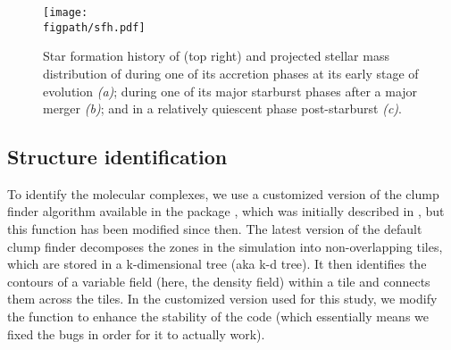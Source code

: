 \documentclass[iop]{emulateapj} %
\begin{document}
\begin{figure*}[htbp]
\centering
\texttt{[image: \\figpath/sfh.pdf]}
\caption{
	Star formation history of \flower (top right) and
	projected stellar mass distribution of \flower during one of its accretion phases
	at its early stage of evolution {\it (a)}; during one of its major starburst phases
	after a major merger {\it (b)}; and in a relatively quiescent phase post-starburst {\it (c)}.
\label{fig:SFH}}
\end{figure*}


\subsection{Structure identification} \label{sec:method}
To identify the molecular complexes, we use a customized version of the clump finder algorithm available in the  package  \citep{Turk2011a}, which was initially described in \citet{Smith09a}, but this function has been modified since then.
%
The latest version of the default  clump finder decomposes the zones in the simulation into non-overlapping tiles, which are stored in a k-dimensional tree (aka k-d tree). It then identifies the contours of a variable field (here, the density field) within a tile and connects them across the tiles. 
In the customized version used for this study, we modify the function to enhance the stability of the code (which essentially means we fixed the bugs in order for it to actually work).
\end{document}

